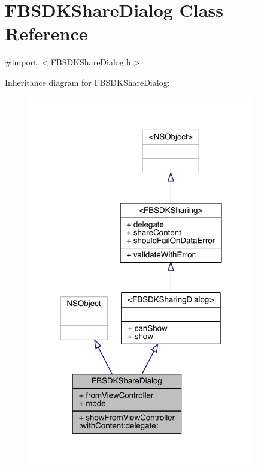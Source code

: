 \hypertarget{interface_f_b_s_d_k_share_dialog}{\section{F\-B\-S\-D\-K\-Share\-Dialog Class Reference}
\label{interface_f_b_s_d_k_share_dialog}
}


{\ttfamily \#import $<$F\-B\-S\-D\-K\-Share\-Dialog.\-h$>$}



Inheritance diagram for F\-B\-S\-D\-K\-Share\-Dialog\-:
\nopagebreak
\begin{figure}[H]
\begin{center}
\leavevmode
\includegraphics[width=281pt]{interface_f_b_s_d_k_share_dialog__inherit__graph}
\end{center}
\end{figure}


